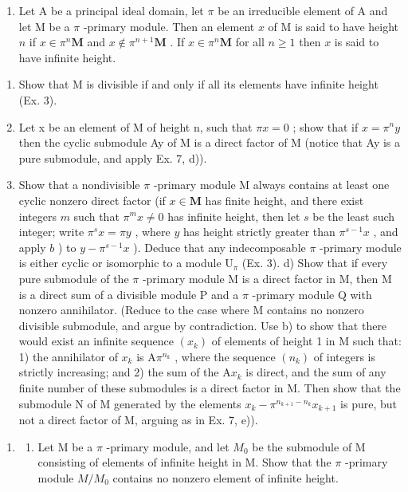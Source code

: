 \begin{enumerate}
\def\labelenumi{\arabic{enumi})}
\setcounter{enumi}{7}
\tightlist
\item
  Let A be a principal ideal domain, let \(\pi\) be an irreducible element of A and let M be a \(\pi\) -primary module. Then an element \(x\) of M is said to have height \(n\) if \(x \in \pi^n\mathbf{M}\) and \(x \notin \pi^{n+1}\mathbf{M}\) . If \(x \in \pi^n\mathbf{M}\) for all \(n \geqslant 1\) then \(x\) is said to have infinite height.
\end{enumerate}

\begin{enumerate}
\def\labelenumi{\alph{enumi})}
\item
  Show that M is divisible if and only if all its elements have infinite height (Ex. 3).
\item
  Let x be an element of M of height n, such that \(\pi x = 0\) ; show that if \(x = \pi^{n}y\) then the cyclic submodule Ay of M is a direct factor of M (notice that Ay is a pure submodule, and apply Ex. 7, d)).
\item
  Show that a nondivisible \(\pi\) -primary module M always contains at least one cyclic nonzero direct factor (if \(x \in \mathbf{M}\) has finite height, and there exist integers \(m\) such that \(\pi^m x \neq 0\) has infinite height, then let \(s\) be the least such integer; write \(\pi^s x = \pi y\) , where \(y\) has height strictly greater than \(\pi^{s-1}x\) , and apply \(b\) ) to \(y - \pi^{s-1}x\) ). Deduce that any indecomposable \(\pi\) -primary module is either cyclic or isomorphic to a module \(\mathrm{U}_{\pi}\) (Ex. 3). d) Show that if every pure submodule of the \(\pi\) -primary module M is a direct factor in M, then M is a direct sum of a divisible module P and a \(\pi\) -primary module Q with nonzero annihilator. (Reduce to the case where M contains no nonzero divisible submodule, and argue by contradiction. Use b) to show that there would exist an infinite sequence \((x_k)\) of elements of height 1 in M such that: 1) the annihilator of \(x_k\) is \(\mathrm{A}\pi^{n_k}\) , where the sequence \((n_k)\) of integers is strictly increasing; and 2) the sum of the \(\mathrm{A}x_k\) is direct, and the sum of any finite number of these submodules is a direct factor in M. Then show that the submodule N of M generated by the elements \(x_k - \pi^{n_{k+1} - n_k}x_{k+1}\) is pure, but not a direct factor of M, arguing as in Ex. 7, e)).
\end{enumerate}

\begin{enumerate}
\def\labelenumi{\arabic{enumi})}
\setcounter{enumi}{8}
\tightlist
\item
  \begin{enumerate}
  \def\labelenumii{\alph{enumii})}
  \tightlist
  \item
    Let M be a \(\pi\) -primary module, and let \(M_{0}\) be the submodule of M consisting of elements of infinite height in M. Show that the \(\pi\) -primary module \(M/M_{0}\) contains no nonzero element of infinite height.
  \end{enumerate}
\end{enumerate}

